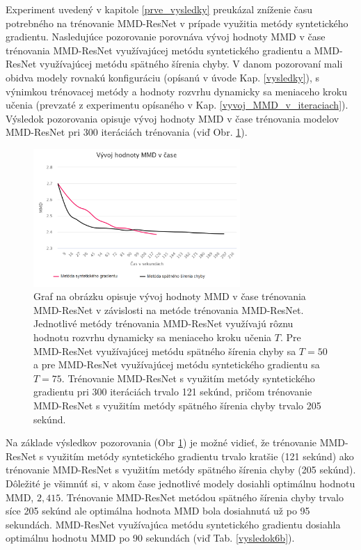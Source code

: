 Experiment uvedený v kapitole \ref{prve_vysledky} preukázal zníženie času potrebného na trénovanie MMD-ResNet v prípade využitia metódy syntetického gradientu. Nasledujúce pozorovanie porovnáva vývoj hodnoty MMD v čase trénovania MMD-ResNet využívajúcej metódu syntetického gradientu a MMD-ResNet využívajúcej metódu spätného šírenia chyby. V danom pozorovaní mali obidva modely rovnakú konfiguráciu (opísanú v úvode Kap. \ref{vysledky}), s výnimkou trénovacej metódy a hodnoty rozvrhu dynamicky sa meniaceho kroku učenia (prevzaté z experimentu opísaného v Kap. \ref{vyvoj_MMD_v_iteraciach}). Výsledok pozorovania opisuje vývoj hodnoty MMD v čase trénovania modelov MMD-ResNet pri 300 iteráciách trénovania (viď Obr. \ref{vysledok6}).

\begin{figure}
\centerline{\includegraphics[width=0.7\textwidth]{images/experimenty/experiment6.png}}
\caption[Vývoj hodnoty MMD v čase trénovania]{Graf na obrázku opisuje vývoj hodnoty MMD v čase trénovania MMD-ResNet v závislosti na metóde trénovania MMD-ResNet. Jednotlivé metódy trénovania MMD-ResNet využívajú rôznu hodnotu rozvrhu dynamicky sa meniaceho kroku učenia $T$. Pre MMD-ResNet využívajúcej metódu spätného šírenia chyby sa $T=50$ a pre MMD-ResNet využívajúcej metódu syntetického gradientu sa $T=75$. Trénovanie MMD-ResNet s využitím metódy syntetického gradientu pri 300 iteráciách trvalo 121 sekúnd, pričom trénovanie MMD-ResNet s využitím metódy spätného šírenia chyby trvalo 205 sekúnd.}
\label{vysledok6}
\end{figure}

Na základe výsledkov pozorovania (Obr \ref{vysledok6}) je možné vidieť, že trénovanie MMD-ResNet s využitím metódy syntetického gradientu trvalo kratšie (121 sekúnd) ako trénovanie MMD-ResNet s využitím metódy spätného šírenia chyby (205 sekúnd). Dôležité je všimnúť si, v akom čase jednotlivé modely dosiahli optimálnu hodnotu MMD, $2,415$. Trénovanie MMD-ResNet metódou spätného šírenia chyby trvalo síce 205 sekúnd ale optimálna hodnota MMD bola dosiahnutá už po 95 sekundách. MMD-ResNet využívajúca metódu syntetického gradientu dosiahla optimálnu hodnotu MMD po 90 sekundách (viď Tab. \ref{vysledok6b}).

